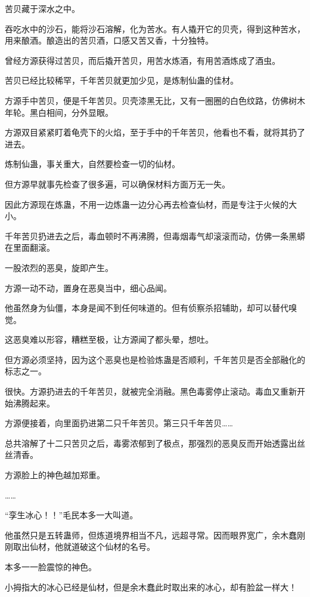 
\begin{this_body}

苦贝藏于深水之中。

吞吃水中的沙石，能将沙石溶解，化为苦水。有人撬开它的贝壳，得到这种苦水，用来酿酒。酿造出的苦贝酒，口感又苦又香，十分独特。

曾经方源获得过苦贝，而后撬开苦贝，用苦水炼酒，有用苦酒炼成了酒虫。

苦贝已经比较稀罕，千年苦贝就更加少见，是炼制仙蛊的佳材。

方源手中苦贝，便是千年苦贝。贝壳漆黑无比，又有一圈圈的白色纹路，仿佛树木年轮。黑白相间，分外显眼。

方源双目紧紧盯着龟壳下的火焰，至于手中的千年苦贝，他看也不看，就将其扔了进去。

炼制仙蛊，事关重大，自然要检查一切的仙材。

但方源早就事先检查了很多遍，可以确保材料方面万无一失。

因此方源现在炼蛊，不用一边炼蛊一边分心再去检查仙材，而是专注于火候的大小。

千年苦贝扔进去之后，毒血顿时不再沸腾，但毒烟毒气却滚滚而动，仿佛一条黑蟒在里面翻滚。

一股浓烈的恶臭，旋即产生。

方源一动不动，置身在恶臭当中，细心品闻。

他虽然身为仙僵，本身是闻不到任何味道的。但有侦察杀招辅助，却可以替代嗅觉。

这恶臭难以形容，糟糕至极，让方源闻了都头晕，想吐。

但方源必须坚持，因为这个恶臭也是检验炼蛊是否顺利，千年苦贝是否全部融化的标志之一。

很快。方源扔进去的千年苦贝，就被完全消融。黑色毒雾停止滚动。毒血又重新开始沸腾起来。

方源便接着，向里面扔进第二只千年苦贝。第三只千年苦贝……

总共溶解了十二只苦贝之后，毒雾浓郁到了极点，那强烈的恶臭反而开始透露出丝丝清香。

方源脸上的神色越加郑重。

……

“孪生冰心！！”毛民本多一大叫道。

他虽然只是五转蛊师，但炼道境界相当不凡，远超寻常。因而眼界宽广，余木蠢刚刚取出仙材，他就道破这个仙材的名号。

本多一一脸震惊的神色。

小拇指大的冰心已经是仙材，但是余木蠢此时取出来的冰心，却有脸盆一样大！


\end{this_body}
